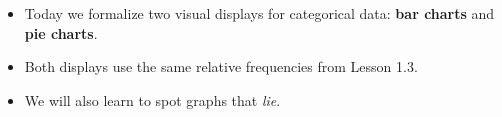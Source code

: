 \documentclass[10pt]{article}
\begin{document}
\vspace{0.14in}

\begin{tcolorbox}[colback=greenbg, colframe=greenacc, boxrule=0.8pt, arc=2mm,
    left=4mm, right=4mm, top=3mm, bottom=3mm]
\small
\begin{itemize}[leftmargin=1.3em, itemsep=5pt]
  \item Today we formalize two visual displays for categorical data:
        \textbf{bar charts} and \textbf{pie charts}.
  \item Both displays use the same relative frequencies from Lesson 1.3.
  \item We will also learn to spot graphs that \textit{lie}.
\end{itemize}
\end{tcolorbox}
\end{document}
